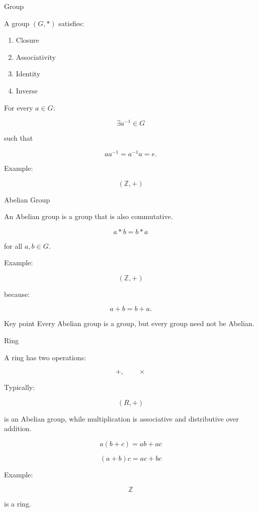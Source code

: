 \documentclass[aspectratio=169,11pt]{beamer}
\begin{document}
\begin{frame}{Group}

A group $(G,*)$ satisfies:

\begin{enumerate}
    \item Closure
    \item Associativity
    \item Identity
    \item Inverse
\end{enumerate}

For every $a\in G$:

\[
\exists a^{-1}\in G
\]

such that

\[
aa^{-1}=a^{-1}a=e.
\]

Example:

\[
(\mathbb Z,+)
\]

\end{frame}

\begin{frame}{Abelian Group}

An Abelian group is a group that is also commutative.

\[
\boxed{
a*b=b*a
}
\]

for all $a,b\in G$.

Example:

\[
(\mathbb Z,+)
\]

because:

\[
a+b=b+a.
\]

\begin{alertblock}{Key point}
Every Abelian group is a group, but every group need not be Abelian.
\end{alertblock}

\end{frame}

\begin{frame}{Ring}

A ring has two operations:

\[
+,\qquad\times
\]

Typically:

\[
(R,+)
\]

is an Abelian group, while multiplication is associative and distributive over addition.

\[
a(b+c)=ab+ac
\]

\[
(a+b)c=ac+bc
\]

Example:

\[
\boxed{\mathbb Z}
\]

is a ring.

\end{frame}
\end{document}
